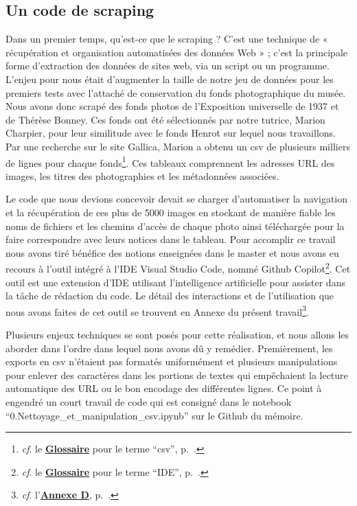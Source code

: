 \subsection{Un code de scraping}

Dans un premier temps, qu'est-ce que le scraping ? C'est une technique de « récupération et organisation automatisées des données Web » ; c'est la principale forme d'extraction des données de sites web, via un script ou un programme. L'enjeu pour nous était d'augmenter la taille de notre jeu de données pour les premiers tests avec l'attaché de conservation du fonds photographique du musée. Nous avons donc scrapé des fonds photos de l'Exposition universelle de 1937 et de Thérèse Bonney. Ces fonds ont été sélectionnés par notre tutrice, Marion Charpier, pour leur similitude avec le fonds Henrot sur lequel nous travaillons. Par une recherche sur le site Gallica, Marion a obtenu un csv de plusieurs milliers de lignes pour chaque fonds\footnote{\textit{cf}. le \textbf{\hyperref[sec:Glossaire]{Glossaire}} pour le terme \enquote{csv}, p.~\pageref{sec:Glossaire}.}. Ces tableaux comprennent les adresses URL des images, les titres des photographies et les métadonnées associées. 

Le code que nous devions concevoir devait se charger d'automatiser la navigation et la récupération de ces plus de 5000 images en stockant de manière fiable les noms de fichiers et les chemins d'accès de chaque photo ainsi téléchargée pour la faire correspondre avec leurs notices dans le tableau. Pour accomplir ce travail nous avons tiré bénéfice des notions enseignées dans le master et nous avons eu recours à l'outil intégré à l'IDE Visual Studio Code, nommé Github Copilot\footnote{\textit{cf}. le \textbf{\hyperref[sec:Glossaire]{Glossaire}} pour le terme \enquote{IDE}, p.~\pageref{sec:Glossaire}.}. Cet outil est une extension d'IDE utilisant l'intelligence artificielle pour assister dans la tâche de rédaction du code. Le détail des interactions et de l'utilisation que nous avons faites de cet outil se trouvent en Annexe du présent travail\footnote{\textit{cf}. l'\textbf{\hyperref[sec:Copilot]{Annexe D}}, p.~\pageref{sec:Copilot}.}.

Plusieurs enjeux techniques se sont posés pour cette réalisation, et nous allons les aborder dans l'ordre dans lequel nous avons dû y remédier. Premièrement, les exports en csv n'étaient pas formatés uniformément et plusieurs manipulations pour enlever des caractères dans les portions de textes qui empêchaient la lecture automatique des URL ou le bon encodage des différentes lignes. Ce point à engendré un court travail de code qui est consigné dans le notebook \enquote{0.Nettoyage\_et\_manipulation\_csv.ipynb} sur le Github du mémoire.

